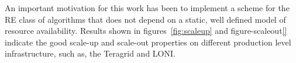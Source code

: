 \documentclass{rspublic}
\newcommand{\alnote}[1]{ {\textcolor{blue} { ***andre: #1 }}}
\newcommand{\athotanote}[1]{ {\textcolor{green} { ***athota: #1 }}}
\newcommand{\alnote}[1]{}
\newcommand{\athotanote}[1]{}
\begin{document}





An important motivation for this work has been to implement a scheme for the RE class of algorithms that does not depend on a static, well defined model of resource availability. %
Results shown in figures~\ref{fig:scaleup} and figure-scaleout\ref{} indicate the good scale-up and scale-out properties on different production level infrastructure, such as, the Teragrid and LONI.
\end{document}
